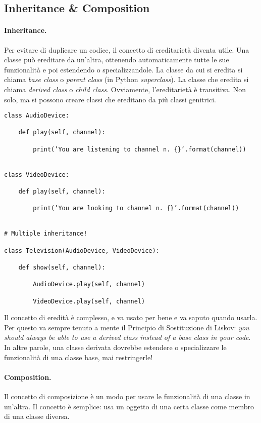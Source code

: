 \documentclass[10pt, a4paper, titlepage]{book}
\begin{document}
\subsection{Inheritance \& Composition}

\paragraph{Inheritance.} Per evitare di duplicare un codice, il concetto di ereditarietà diventa utile. Una classe può ereditare da un'altra, ottenendo automaticamente tutte le sue funzionalità e poi estendendo o specializzandole.
La classe da cui si eredita si chiama \textit{base class} o \textit{parent class} (in Python \textit{superclass}). La classe che eredita si chiama \textit{derived class} o \textit{child class}.
Ovviamente, l'ereditarietà è transitiva. Non solo, ma si possono creare classi che ereditano da più classi genitrici.

\begin{verbatim}
class AudioDevice:

	def play(self, channel):

		print(’You are listening to channel n. {}’.format(channel))


class VideoDevice:

	def play(self, channel):

		print(’You are looking to channel n. {}’.format(channel))


# Multiple inheritance!

class Television(AudioDevice, VideoDevice):

	def show(self, channel):

		AudioDevice.play(self, channel)

		VideoDevice.play(self, channel)
\end{verbatim}

Il concetto di eredità è complesso, e va usato per bene e va saputo quando usarla. Per questo va sempre tenuto a mente il Principio di Sostituzione di Liskov: \textit{you should always be able to use a derived class instead of a base class in your code}. In altre parole, una classe derivata dovrebbe estendere o specializzare le funzionalità di una classe base, mai restringerle!

\paragraph{Composition.} Il concetto di composizione è un modo per usare le funzionalità di una classe in un'altra. Il concetto è semplice: usa un oggetto di una certa classe come membro di una classe diversa. 
\end{document}
